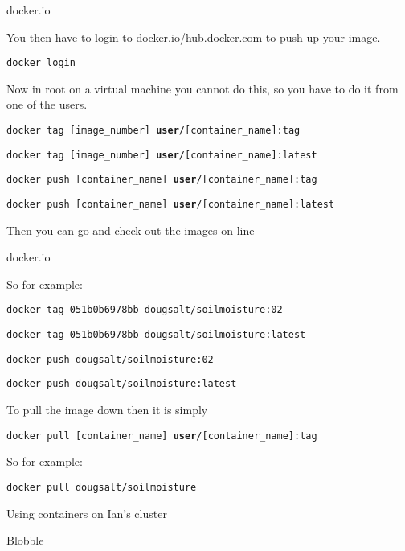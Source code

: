\documentclass[usenames,dvipsnames,10pt]{beamer}
\begin{document}
\begin{frame}{docker.io}

    \vfill
    You then have to login to docker.io/hub.docker.com to push up your image.

    \vfill
    \texttt{\color{blue}docker login}


    \vfill
    Now in root on a virtual machine you cannot do this, so you have to do it
    from one of the users.

    \vfill

    \small
    \texttt{{\color{blue}docker} {\color{red}tag} {\color{green}[image\_number]} \textbf{user}/{\color{green}[container\_name]}:{\color{orange}tag}}

    \texttt{{\color{blue}docker} {\color{red}tag} {\color{green}[image\_number]} \textbf{user}/{\color{green}[container\_name]}:latest}

    \texttt{{\color{blue}docker} {\color{red}push} {\color{green}[container\_name]} \textbf{user}/{\color{green}[container\_name]}:{\color{orange}tag}}

    \texttt{{\color{blue}docker} {\color{red}push} {\color{green}[container\_name]} \textbf{user}/{\color{green}[container\_name]}:latest}

    \normalsize
    \vfill

    Then you can go and check out the images on line

    \vfill

\end{frame}

\begin{frame}{docker.io}

    \vfill

    So for example:

    \vfill

    \texttt{\color{blue}docker tag 051b0b6978bb dougsalt/soilmoisture:02}

    \texttt{\color{blue}docker tag 051b0b6978bb dougsalt/soilmoisture:latest}

    \texttt{\color{blue}docker push dougsalt/soilmoisture:02}

    \texttt{\color{blue}docker push dougsalt/soilmoisture:latest}
    
    \vfill

    To pull the image down then it is simply
    
    \vfill

    \small
    \texttt{{\color{blue}docker} {\color{red}pull} {\color{green}[container\_name]} \textbf{user}/{\color{green}[container\_name]}:{\color{orange}tag}}
    \normalsize

    \vfill
    So for example:
    \vfill
    
    \texttt{\color{blue}docker pull dougsalt/soilmoisture}
    
    \vfill
\end{frame}
\begin{frame}{Using containers on Ian's cluster}

    Blobble
\end{frame}
\end{document}

